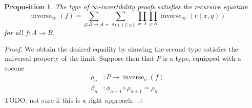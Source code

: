 \documentclass{article}
\theoremstyle{plain}
\newtheorem{proposition}[theorem]{Proposition}
\theoremstyle{definition}
\theoremstyle{remark}
\DeclareMathOperator{\inverse}{inverse}
\DeclareMathOperator{\adj}{Adj}
\newcommand{\ninverse}[1]{\inverse_{#1}}
\begin{document}
\begin{proposition}
  The type of \(\infty\)-invertibility proofs satisfies the recursive equation
  \[\ninverse{\infty}(f) =
    \sum_{g : B \to A}\sum_{r : \adj(f, g)}
    \prod_{x : A}\prod_{y : B}\ninverse{\infty}(r(x, y))\]
  for all \(f : A \to B\).
\end{proposition}

\begin{proof}
  We obtain the desired equality by showing the second type satisfies the universal property
  of the limit. Suppose then that \(P\) is a type, equipped with a cocone
  \begin{align*}
    \rho_{n}     &: P \to \ninverse{n}(f) \\
    \beta_{n} &: \phi_{n + 1} \circ \rho_{n + 1} = \rho_{n}.
  \end{align*}
  TODO: not sure if this is a right approach.
\end{proof}
\end{document}
